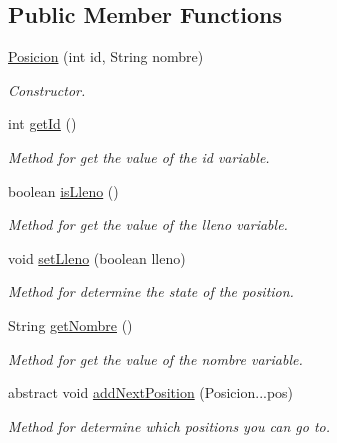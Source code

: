 \subsection*{Public Member Functions}
\begin{DoxyCompactItemize}
\item 
\mbox{\hyperlink{classmodelo_1_1_posicion_a8071cf7469c2dddabf012cde36d1ed78}{Posicion}} (int id, String nombre)
\begin{DoxyCompactList}\small\item\em Constructor. \end{DoxyCompactList}\item 
int \mbox{\hyperlink{classmodelo_1_1_posicion_ad81fc23f1ccae2caa6fe85ed510d8925}{get\+Id}} ()
\begin{DoxyCompactList}\small\item\em Method for get the value of the id variable. \end{DoxyCompactList}\item 
boolean \mbox{\hyperlink{classmodelo_1_1_posicion_acaad3114bb7123d7b9c75c82a50d5a4e}{is\+Lleno}} ()
\begin{DoxyCompactList}\small\item\em Method for get the value of the lleno variable. \end{DoxyCompactList}\item 
void \mbox{\hyperlink{classmodelo_1_1_posicion_a508d39b3c2031a5bbbf9bb3f6a4f3e5d}{set\+Lleno}} (boolean lleno)
\begin{DoxyCompactList}\small\item\em Method for determine the state of the position. \end{DoxyCompactList}\item 
String \mbox{\hyperlink{classmodelo_1_1_posicion_af349bd584f20e43466bdc838469f95df}{get\+Nombre}} ()
\begin{DoxyCompactList}\small\item\em Method for get the value of the nombre variable. \end{DoxyCompactList}\item 
abstract void \mbox{\hyperlink{classmodelo_1_1_posicion_a6523ec41020a97ad305b9997c88f363c}{add\+Next\+Position}} (Posicion...\+pos)
\begin{DoxyCompactList}\small\item\em Method for determine which positions you can go to. \end{DoxyCompactList}\end{DoxyCompactItemize}


